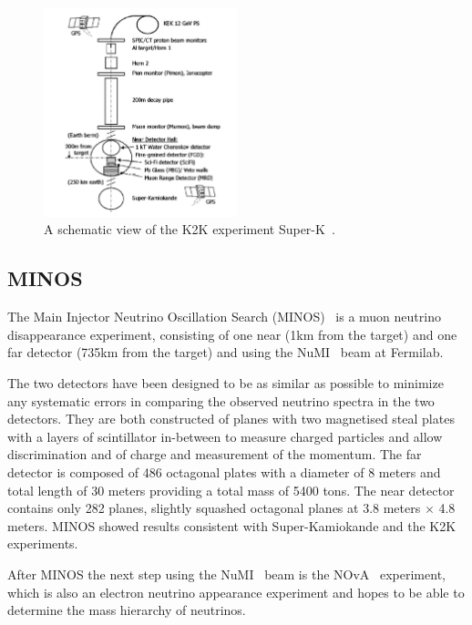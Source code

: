 \begin{figure}[h!]
\centering
  \centering
\includegraphics[width=0.5\textwidth]{figures/KEK.jpeg}
\vspace{2mm}
\caption{A schematic view of the K2K experiment Super-K~\cite{70K2K}.}
\label{fig:K2K}
\end{figure}

\subsection{MINOS}

The Main Injector Neutrino Oscillation Search (MINOS)~\cite{MINOS} is a muon neutrino disappearance experiment, consisting of one near (1km from the target) and one far detector (735km from the target) and using the NuMI~\cite{19NuMI} beam at Fermilab. 

The two detectors have been designed to be as similar as possible to minimize any systematic errors in comparing the observed neutrino spectra in the two detectors. They are both constructed of planes with two magnetised steal plates with a layers of scintillator in-between to measure charged particles and allow discrimination and of charge and measurement of the momentum. The far detector is composed of 486 octagonal plates with a diameter of 8 meters and total length of 30 meters providing a total mass of 5400 tons. The near detector contains only 282 planes, slightly squashed octagonal planes at 3.8 meters $\times$ 4.8 meters. MINOS showed results consistent with Super-Kamiokande and the K2K experiments. 

After MINOS the next step using the NuMI~\cite{19NuMI} beam is the NOvA~\cite{18nova} experiment, which is also an electron neutrino appearance experiment and hopes to be able to determine the mass hierarchy of neutrinos.

